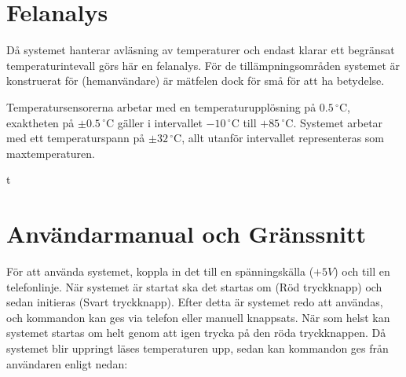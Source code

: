 \documentclass[a4paper,11pt]{article}
\begin{document}
\section{Felanalys}

Då systemet hanterar avläsning av temperaturer och endast klarar ett begränsat temperaturintevall
görs här en felanalys. För de tillämpningsområden systemet är konstruerat för (hemanvändare) 
är mätfelen dock för små för att ha betydelse.

Temperatursensorerna arbetar med en temperaturupplösning på $0.5\,^{\circ}\mathrm{C}$, exaktheten på $\pm 0.5\,^{\circ}\mathrm{C}$ gäller i intervallet $-10\,^{\circ}\mathrm{C}$ till $+85\,^{\circ}\mathrm{C}$.
Systemet arbetar med ett temperaturspann på $\pm 32\,^{\circ}\mathrm{C}$, allt utanför intervallet representeras som maxtemperaturen.

\pagebreak

	\appendix
	\renewcommand{\appendixpagename}{Appendix}t
	\appendixpage
	\renewcommand{\appendixtocname}{Appendix}

	\addappheadtotoc

	\section{Användarmanual och Gränssnitt}
	\label{sec:Manual}
	För att använda systemet, koppla in det till en spänningskälla ($+5V$) och till en telefonlinje.
	När systemet är startat ska det startas om (Röd tryckknapp) och sedan initieras (Svart tryckknapp).
	Efter detta är systemet redo att användas, och kommandon kan ges via telefon eller manuell knappsats.
	När som helst kan systemet startas om helt genom att igen trycka på den röda tryckknappen.
	Då systemet blir uppringt läses temperaturen upp, sedan kan kommandon ges från användaren enligt nedan:\\
\end{document}
